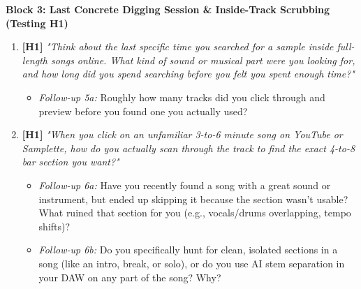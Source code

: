 \vspace{0.3em}
\noindent\textbf{Block 3: Last Concrete Digging Session \& Inside-Track Scrubbing (Testing H1)}
\begin{enumerate}[resume, leftmargin=*, nosep]
    \item \textbf{[H1]} \textit{"Think about the last specific time you searched for a sample inside full-length songs online. What kind of sound or musical part were you looking for, and how long did you spend searching before you felt you spent enough time?"}
    \begin{itemize}[leftmargin=1.5cm, nosep]
        \item \textit{Follow-up 5a:} Roughly how many tracks did you click through and preview before you found one you actually used?
    \end{itemize}
    \item \textbf{[H1]} \textit{"When you click on an unfamiliar 3-to-6 minute song on YouTube or Samplette, how do you actually scan through the track to find the exact 4-to-8 bar section you want?"}
    \begin{itemize}[leftmargin=1.5cm, nosep]
        \item \textit{Follow-up 6a:} Have you recently found a song with a great sound or instrument, but ended up skipping it because the section wasn't usable? What ruined that section for you (e.g., vocals/drums overlapping, tempo shifts)?
        \item \textit{Follow-up 6b:} Do you specifically hunt for clean, isolated sections in a song (like an intro, break, or solo), or do you use AI stem separation in your DAW on any part of the song? Why?
    \end{itemize}
\end{enumerate}


